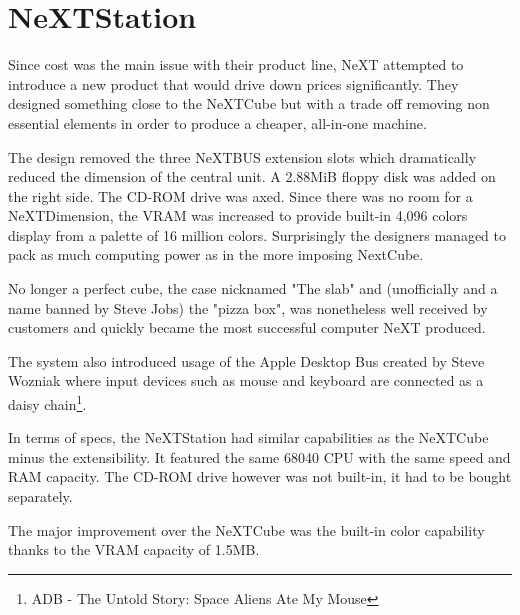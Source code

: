 \section{NeXTStation}
Since cost was the main issue with their product line, NeXT attempted to introduce a new product that would drive down prices significantly. They designed something close to the NeXTCube but with a trade off removing non essential elements in order to produce a cheaper, all-in-one machine.\\
\par
 The design removed the three NeXTBUS extension slots which dramatically reduced the dimension of the central unit. A 2.88MiB floppy disk was added on the right side. The CD-ROM drive was axed. Since there was no room for a NeXTDimension, the VRAM was increased to provide built-in 4,096 colors display from a palette of 16 million colors. Surprisingly the designers managed to pack as much computing power as in the more imposing NextCube.\\
\par 
{}
\par
No longer a perfect cube, the case nicknamed "The slab" and (unofficially and a name banned by Steve Jobs) the "pizza box", was nonetheless well received by customers and quickly became the most successful computer NeXT produced.\\
\par
The system also introduced usage of the Apple Desktop Bus created by Steve Wozniak where input devices such as mouse and keyboard are connected as a daisy chain\footnote{ADB - The Untold Story: Space Aliens Ate My Mouse}.\\

\par
{}
\par
In terms of specs, the NeXTStation had similar capabilities as the NeXTCube minus the extensibility. It featured the same 68040 CPU with the same speed and RAM capacity. The CD-ROM drive however was not built-in, it had to be bought separately.\\
\par
The major improvement over the NeXTCube was the built-in color capability thanks to the VRAM capacity of 1.5MB.\\
\par
\pagebreak









